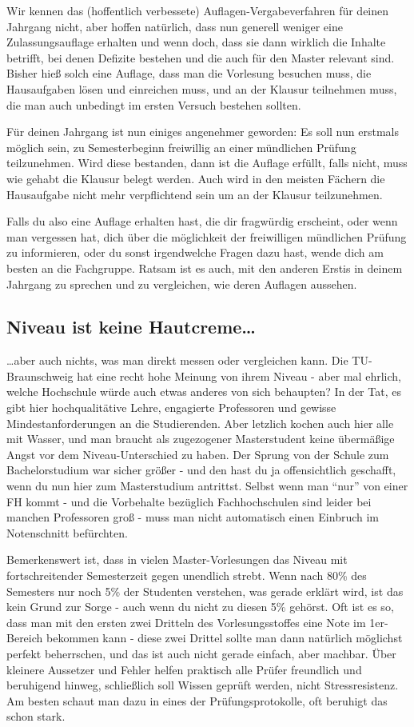 \begin{multicols}{2}
Wir kennen das (hoffentlich verbessete) Auflagen-Vergabeverfahren für deinen Jahrgang nicht, aber hoffen natürlich, dass nun generell weniger eine Zulassungsauflage erhalten und wenn doch, dass sie dann wirklich die Inhalte betrifft, bei denen Defizite bestehen und die auch für den Master relevant sind. Bisher hieß solch eine Auflage, dass man die Vorlesung besuchen muss, die Hausaufgaben lösen und einreichen muss, und an der Klausur teilnehmen muss, die man auch unbedingt im ersten Versuch bestehen sollten. 

Für deinen Jahrgang ist nun einiges angenehmer geworden: Es soll nun erstmals möglich sein, zu Semesterbeginn freiwillig an einer mündlichen Prüfung teilzunehmen. Wird diese bestanden, dann ist die Auflage erfüllt, falls nicht, muss wie gehabt die Klausur belegt werden. Auch wird in den meisten Fächern die Hausaufgabe nicht mehr verpflichtend sein um an der Klausur teilzunehmen.

Falls du also eine Auflage erhalten hast, die dir fragwürdig erscheint, oder wenn man vergessen hat, dich über die möglichkeit der freiwilligen mündlichen Prüfung zu informieren, oder du sonst irgendwelche Fragen dazu hast, wende dich am besten an die Fachgruppe. Ratsam ist es auch, mit den anderen Erstis in deinem Jahrgang zu sprechen und zu vergleichen, wie deren Auflagen aussehen.

\subsection{Niveau ist keine Hautcreme\ldots}
\ldots aber auch nichts, was man direkt messen oder vergleichen kann. Die TU-Braunschweig hat eine recht hohe Meinung von ihrem Niveau - aber mal ehrlich, welche Hochschule würde auch etwas anderes von sich behaupten? In der Tat, es gibt hier hochqualitätive Lehre, engagierte Professoren und gewisse Mindestanforderungen an die Studierenden. Aber letzlich kochen auch hier alle mit Wasser, und man braucht als zugezogener Masterstudent keine übermäßige Angst vor dem Niveau-Unterschied zu haben. Der Sprung von der Schule zum Bachelorstudium war sicher größer - und den hast du ja offensichtlich geschafft, wenn du nun hier zum Masterstudium antrittst. Selbst wenn man "`nur"' von einer FH kommt - und die Vorbehalte bezüglich Fachhochschulen sind leider bei manchen Professoren groß - muss man nicht automatisch einen Einbruch im Notenschnitt befürchten.

Bemerkenswert ist, dass in vielen Master-Vorlesungen das Niveau mit fortschreitender Semesterzeit gegen unendlich strebt. Wenn nach 80\% des Semesters nur noch 5\% der Studenten verstehen, was gerade erklärt wird, ist das kein Grund zur Sorge - auch wenn du nicht zu diesen 5\% gehörst. Oft ist es so, dass man mit den ersten zwei Dritteln des Vorlesungsstoffes eine Note im 1er-Bereich bekommen kann - diese zwei Drittel sollte man dann natürlich möglichst perfekt beherrschen, und das ist auch nicht gerade einfach, aber machbar. Über kleinere Aussetzer und Fehler helfen praktisch alle Prüfer freundlich und beruhigend hinweg, schließlich soll Wissen geprüft werden, nicht Stressresistenz. Am besten schaut man dazu in eines der Prüfungsprotokolle, oft beruhigt das schon stark.


\end{multicols}
